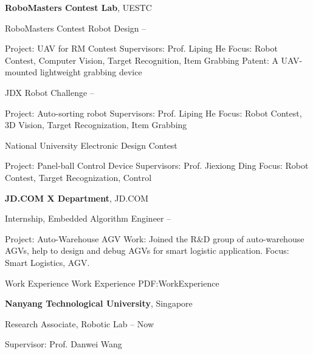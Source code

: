 \documentclass[letterpaper,MMMyyyy,nonstopmode]{simpleresumecv}
\begin{document}
\begin{Body}
\Gap
\Entry
{\textbf{RoboMasters Contest Lab}},
UESTC

\BulletItem
RoboMasters Contest Robot Design
\hfill
{} --
\begin{Detail}
	\SubBulletItem
	Project:
	UAV for RM Contest
	\SubBulletItem
	Supervisors:
	Prof. Liping He
	\SubBulletItem
	Focus:
	Robot Contest, Computer Vision, Target Recognition, Item Grabbing
	\SubBulletItem
	Patent:
	A UAV-mounted lightweight grabbing device
	
\end{Detail}

\BulletItem
JDX Robot Challenge \cite{lxyjd2017}
\hfill
{} --
\begin{Detail}
	\SubBulletItem
	Project:
	Auto-sorting robot
	\SubBulletItem
	Supervisors:
	Prof. Liping He
	\SubBulletItem
	Focus:
	Robot Contest, 3D Vision, Target Recognization, Item Grabbing
\end{Detail}

\BulletItem
National University Electronic Design Contest
\hfill
{} 
\begin{Detail}
	\SubBulletItem
	Project:
	Panel-ball Control Device
	\SubBulletItem
	Supervisors:
	Prof. Jiexiong Ding
	\SubBulletItem
	Focus:
	Robot Contest, Target Recognization, Control
\end{Detail}

\Gap
\Entry
{\textbf{JD.COM X Department}}, JD.COM

\BulletItem
Internship, Embedded Algorithm Engineer
\hfill
{} --
\begin{Detail}
	\SubBulletItem
	Project:
	Auto-Warehouse AGV
	\SubBulletItem
	Work: Joined the R\&D group of auto-warehouse AGVs, help to design and debug AGVs for smart logistic application.
	\SubBulletItem
	Focus:
	Smart Logistics, AGV.
\end{Detail}


\Section
{Work\newline
	Experience}
{Work Experience}
{PDF:WorkExperience}

\Entry
{\textbf{Nanyang Technological University}},
Singapore

\BulletItem
Research Associate,
Robotic Lab
\hfill
{} --
Now
\begin{Detail}
	\SubBulletItem
	Supervisor:
	Prof. Danwei Wang
\end{Detail}


\end{Body}
\end{document}
